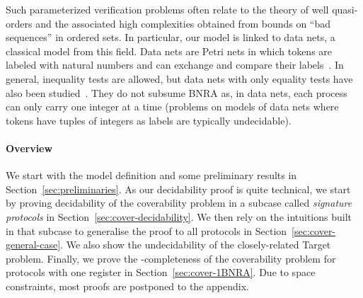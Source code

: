 Such parameterized verification problems often relate to the theory of well quasi-orders
and the associated high complexities obtained from bounds on ``bad sequences'' in ordered sets. In particular, our model is linked to data nets, a classical model from this field. Data nets are Petri nets in which tokens are labeled with natural numbers and can exchange and compare their labels~\cite{LazicNORW08}. In general, inequality tests are allowed, but data nets with only equality tests have also been studied~\cite{Rosa-Velardo17}. They do not subsume BNRA as, in data nets, each process can only carry one integer at a time (problems on models of data nets where tokens have tuples of integers as labels are typically undecidable).

\paragraph*{Overview}
We start with the model definition and some preliminary results in Section~\ref{sec:preliminaries}. As our decidability proof is quite technical, we start by proving decidability of the coverability problem in a subcase called \emph{signature protocols} in Section~\ref{sec:cover-decidability}.
We then rely on the intuitions built in that subcase to generalise the proof to all protocols in Section~\ref{sec:cover-general-case}. We also show the undecidability of the closely-related Target problem.
Finally, we prove the \NP-completeness of the coverability problem for protocols with one register in Section~\ref{sec:cover-1BNRA}.
Due to space constraints, most proofs are postponed to the appendix.

